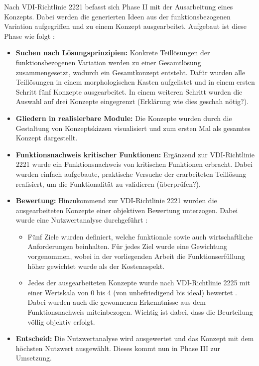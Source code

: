 Nach  VDI-Richtlinie 2221 befasst sich Phase II mit der Ausarbeitung eines Konzepts. Dabei werden die generierten Ideen aus der funktionsbezogenen Variation aufgegriffen und zu einem Konzept ausgearbeitet. Aufgebaut ist diese Phase wie folgt \cite{vdi2221}:

\begin{itemize}
	\item \textbf{Suchen nach Lösungsprinzipien:} Konkrete Teillösungen der funktionsbezogenen Variation werden zu einer Gesamtlösung zusammengesetzt, wodurch ein Gesamtkonzept entsteht. Dafür wurden alle Teillösungen in einem morphologischen Kasten aufgelistet und in einem ersten Schritt fünf Konzepte ausgearbeitet. In einem weiteren Schritt wurden die Auswahl auf drei Konzepte eingegrenzt (Erklärung wie dies geschah nötig?).
	
	\item \textbf{Gliedern in realisierbare Module:} Die Konzepte wurden durch die Gestaltung von Konzeptskizzen visualisiert und zum ersten Mal als gesamtes Konzept dargestellt. 
	
	\item \textbf{Funktionsnachweis kritischer Funktionen:} Ergänzend zur VDI-Richtlinie 2221 wurde ein Funktionsnachweis von kritischen Funktionen erbracht. Dabei wurden einfach aufgebaute, praktische Versuche der erarbeiteten Teillösung realisiert, um die Funktionalität zu validieren (überprüfen?).
	
	\item \textbf{Bewertung:} Hinzukommend zur VDI-Richtlinie 2221 wurden die ausgearbeiteten Konzepte einer objektiven Bewertung unterzogen. Dabei wurde eine Nutzwertanalyse durchgeführt \cite{pahl}:
	\begin{itemize}
		\item Fünf Ziele wurden definiert, welche funktionale sowie auch wirtschaftliche Anforderungen beinhalten. Für jedes Ziel wurde eine Gewichtung vorgenommen, wobei in der vorliegenden Arbeit die Funktionserfüllung höher gewichtet wurde als der Kostenaspekt.
		
		\item Jedes der ausgearbeiteten Konzepte wurde nach VDI-Richtlinie 2225 mit einer Wertskala von 0 bis 4 (von unbefriedigend bis ideal) bewertet \cite{vdi2225}. Dabei wurden auch die gewonnenen Erkenntnisse aus dem Funktionsnachweis miteinbezogen. Wichtig ist dabei, dass die Beurteilung völlig objektiv erfolgt.
	\end{itemize}	
	
	\item \textbf{Entscheid:} Die Nutzwertanalyse wird ausgewertet und das Konzept mit dem höchsten Nutzwert ausgewählt. Dieses kommt nun in Phase III zur Umsetzung. 
\end{itemize}

